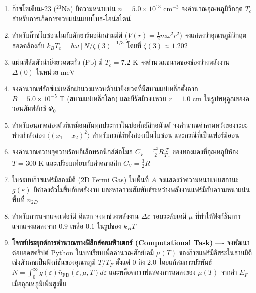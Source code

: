 \begin{enumerate}[label=\textbf{\arabic*.}]
    \item ก๊าซโซเดียม-23 ($^{23}\text{Na}$) มีความหนาแน่น $n = 5.0 \times 10^{13}\text{ cm}^{-3}$ จงคำนวณอุณหภูมิวิกฤต $T_c$ สำหรับการเกิดการควบแน่นแบบโบส-ไอน์สไตน์
    \item สำหรับก๊าซโบซอนในกับดักฮาร์มอนิกสามมิติ ($V(r) = \frac{1}{2}m\omega^2 r^2$) จงแสดงว่าอุณหภูมิวิกฤตสอดคล้องกับ $k_B T_c = \hbar\omega [N/\zeta(3)]^{1/3}$ โดยที่ $\zeta(3) \approx 1.202$
    \item แผ่นฟิล์มตัวนำยิ่งยวดตะกั่ว ($\text{Pb}$) มี $T_c = 7.2\text{ K}$ จงคำนวณขนาดของช่องว่างพลังงาน $\Delta(0)$ ในหน่วย $\text{meV}$
    \item จงคำนวณฟลักซ์แม่เหล็กผ่านวงแหวนตัวนำยิ่งยวดที่มีสนามแม่เหล็กตั้งฉาก $B = 5.0 \times 10^{-5}\text{ T}$ (สนามแม่เหล็กโลก) และมีรัศมีวงแหวน $r = 1.0\text{ cm}$ ในรูปพหุคูณของควอนตัมฟลักซ์ $\Phi_0$
    \item สำหรับอนุภาคสองตัวที่เหมือนกันทุกประการในบ่อศักย์ลึกอนันต์ จงคำนวณค่าคาดหวังของระยะห่างกำลังสอง $\langle (x_1 - x_2)^2 \rangle$ สำหรับกรณีที่ทั้งสองเป็นโบซอน และกรณีที่เป็นเฟอร์มิออน
    \item จงคำนวณความจุความร้อนอิเล็กทรอนิกส์ต่อโมล $C_V = \frac{\pi^2}{2} R \frac{T}{T_F}$ ของทองแดงที่อุณหภูมิห้อง $T = 300\text{ K}$ และเปรียบเทียบกับค่าคลาสสิก $C_V = \frac{3}{2} R$
    \item ในระบบก๊าซแฟร์มีสองมิติ (2D Fermi Gas) ในพื้นที่ $A$ จงแสดงว่าความหนาแน่นสถานะ $g(\varepsilon)$ มีค่าคงตัวไม่ขึ้นกับพลังงาน และหาความสัมพันธ์ระหว่างพลังงานแฟร์มีกับความหนาแน่นพื้นที่ $n_{2D}$
    \item สำหรับการแจกแจงเฟอร์มิ-ดิแรก จงหาช่วงพลังงาน $\Delta\varepsilon$ รอบระดับเคมี $\mu$ ที่ทำให้ฟังก์ชันการแจกแจงลดลงจาก $0.9$ เหลือ $0.1$ ในรูปของ $k_B T$
    \item \textbf{โจทย์ประยุกต์การคำนวณทางฟิสิกส์คอมพิวเตอร์ (Computational Task)} ---- จงพัฒนาต่อยอดสคริปต์ Python ในบทเรียนเพื่อคำนวณศักย์เคมี $\mu(T)$ ของก๊าซแฟร์มีอิสระในสามมิติเชิงตัวเลขเป็นฟังก์ชันของอุณหภูมิ $T/T_F$ ตั้งแต่ $0$ ถึง $2.0$ โดยแก้สมการปริพันธ์ $N = \int_0^\infty g(\varepsilon) \bar{n}_{\text{FD}}(\varepsilon, \mu, T) d\varepsilon$ และพล็อตกราฟแสดงการลดลงของ $\mu(T)$ จากค่า $E_F$ เมื่ออุณหภูมิเพิ่มสูงขึ้น
\end{enumerate}
